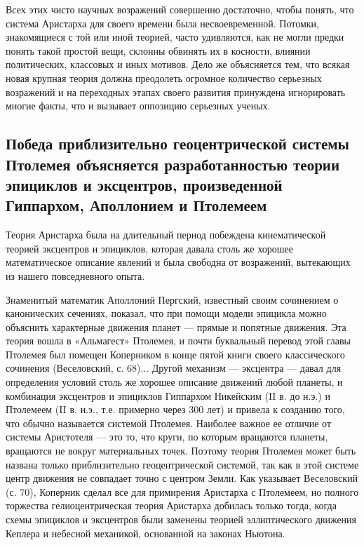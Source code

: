 Всех  этих  чисто  научных  возражений  совершенно  достаточно,  чтобы
понять, что система Аристарха для своего времени была несвоевременной.
Потомки, знакомящиеся с той или иной теорией, часто удивляются, как не
могли  предки  понять  такой  простой  вещи,  склонны  обвинять  их  в
косности,  влиянии политических,  классовых  и иных  мотивов. Дело  же
объясняется  тем, что  всякая новая  крупная теория  должна преодолеть
огромное  количество  серьезных  возражений  и  на  переходных  этапах
своего развития  принуждена игнорировать многие факты,  что и вызывает
оппозицию серьезных ученых.

\subsection{Победа  приблизительно  геоцентрической  системы  Птолемея
объясняется   разработанностью   теории    эпициклов   и   эксцентров,
произведенной Гиппархом, Аполлонием и Птолемеем}

Теория Аристарха  была на  длительный период  побеждена кинематической
теорией  эксцентров  и  эпициклов,  которая давала  столь  же  хорошее
математическое  описание  явлений  и   была  свободна  от  возражений,
вытекающих из нашего повседневного опыта.

Знаменитый математик Аполлоний Пергский,  известный своим сочинением о
канонических сечениях,  показал, что при помощи  модели эпицикла можно
объяснить характерные движения планет  --- прямые и попятные движения.
Эта теория  вошла в «Альмагест»  Птолемея, и почти  буквальный перевод
этой главы Птолемея был помещен  Коперником в конце пятой книги своего
классического сочинения  (Веселовский, с.  68)... Другой  механизм ---
эксцентра --- давал для определения  условий столь же хорошее описание
движений любой планеты, и  комбинация эксцентров и эпициклов Гиппархом
Никейским (II в. до н.э.) и Птолемеем (II в. н.э., т.е. примерно через
300 лет)  и привела  к созданию того,  что обычно  называется системой
Птолемея. Наиболее  важное ее  отличие от  системы Аристотеля  --- это
то,  что круги,  по  которым вращаются  планеты,  вращаются не  вокруг
материальных точек. Поэтому теория  Птолемея может быть названа только
приблизительно геоцентрической системой, так  как в этой системе центр
движения не совпадает точно с центром Земли. Как указывает Веселовский
(с. 70), Коперник сделал все  для примирения Аристарха с Птолемеем, но
полного торжества  гелиоцентрическая теория Аристарха  добилась только
тогда,  когда  схемы  эпициклов  и эксцентров  были  заменены  теорией
эллиптического движения  Кеплера и  небесной механикой,  основанной на
законах Ньютона.

